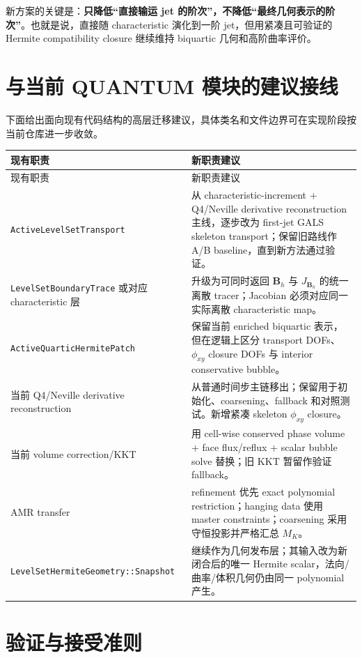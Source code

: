 \documentclass[11pt,a4paper]{ctexart}
\newcommand{\bB}{\bm{B}}
\begin{document}
新方案的关键是：\textbf{只降低“直接输运 jet 的阶次”，不降低“最终几何表示的阶次”}。也就是说，直接随 characteristic 演化到一阶 jet，但用紧凑且可验证的 Hermite compatibility closure 继续维持 biquartic 几何和高阶曲率评价。

\section{与当前 QUANTUM 模块的建议接线}

下面给出面向现有代码结构的高层迁移建议，具体类名和文件边界可在实现阶段按当前仓库进一步收敛。

\begin{longtable}{p{}p{}}
\toprule
现有职责 & 新职责建议 \\
\midrule
\endfirsthead
\toprule
现有职责 & 新职责建议 \\
\midrule
\endhead
\texttt{ActiveLevelSetTransport} & 从 characteristic-increment + Q4/Neville derivative reconstruction 主线，逐步改为 first-jet GALS skeleton transport；保留旧路线作 A/B baseline，直到新方法通过验证。 \\
\addlinespace
\texttt{LevelSetBoundaryTrace} 或对应 characteristic 层 & 升级为可同时返回 $\bB_h$ 与 $J_{\bB_h}$ 的统一离散 tracer；Jacobian 必须对应同一实际离散 characteristic map。 \\
\addlinespace
\texttt{ActiveQuarticHermitePatch} & 保留当前 enriched biquartic 表示，但在逻辑上区分 transport DOFs、$\phi_{xy}$ closure DOFs 与 interior conservative bubble。 \\
\addlinespace
当前 Q4/Neville derivative reconstruction & 从普通时间步主链移出；保留用于初始化、coarsening、fallback 和对照测试。新增紧凑 skeleton $\phi_{xy}$ closure。 \\
\addlinespace
当前 volume correction/KKT & 用 cell-wise conserved phase volume + face flux/reflux + scalar bubble solve 替换；旧 KKT 暂留作验证 fallback。 \\
\addlinespace
AMR transfer & refinement 优先 exact polynomial restriction；hanging data 使用 master constraints；coarsening 采用守恒投影并严格汇总 $M_K$。 \\
\addlinespace
\texttt{LevelSetHermiteGeometry::Snapshot} & 继续作为几何发布层；其输入改为新闭合后的唯一 Hermite scalar，法向/曲率/体积几何仍由同一 polynomial 产生。 \\
\bottomrule
\end{longtable}

\section{验证与接受准则}
\end{document}

